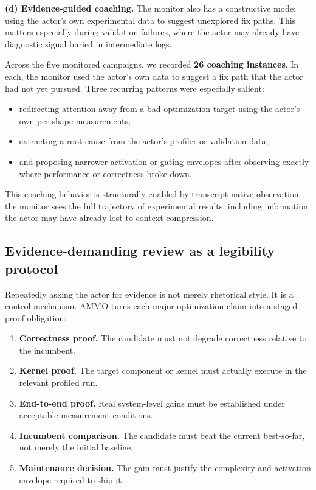 \documentclass[11pt]{article}
\begin{document}
\textbf{(d) Evidence-guided coaching.}
The monitor also has a constructive mode: using the actor's own experimental data to suggest unexplored fix paths. This matters especially during validation failures, where the actor may already have diagnostic signal buried in intermediate logs.

Across the five monitored campaigns, we recorded \textbf{26 coaching instances}. In each, the monitor used the actor's own data to suggest a fix path that the actor had not yet pursued. Three recurring patterns were especially salient:

\begin{itemize}[leftmargin=*,itemsep=2pt]
  \item redirecting attention away from a bad optimization target using the actor's own per-shape measurements,
  \item extracting a root cause from the actor's profiler or validation data,
  \item and proposing narrower activation or gating envelopes after observing exactly where performance or correctness broke down.
\end{itemize}

This coaching behavior is structurally enabled by transcript-native observation: the monitor sees the full trajectory of experimental results, including information the actor may have already lost to context compression.

\subsection{Evidence-demanding review as a legibility protocol}
\label{sec:legibility}

Repeatedly asking the actor for evidence is not merely rhetorical style. It is a control mechanism. AMMO turns each major optimization claim into a staged proof obligation:

\begin{enumerate}[leftmargin=*,itemsep=2pt]
  \item \textbf{Correctness proof.} The candidate must not degrade correctness relative to the incumbent.
  \item \textbf{Kernel proof.} The target component or kernel must actually execute in the relevant profiled run.
  \item \textbf{End-to-end proof.} Real system-level gains must be established under acceptable measurement conditions.
  \item \textbf{Incumbent comparison.} The candidate must beat the current best-so-far, not merely the initial baseline.
  \item \textbf{Maintenance decision.} The gain must justify the complexity and activation envelope required to ship it.
\end{enumerate}
\end{document}
